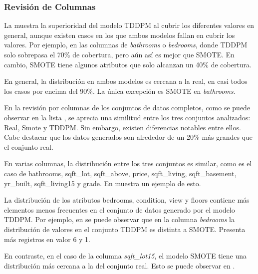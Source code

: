 \newpage
\subsubsection{Revisión de Columnas}
La  muestra la superioridad del modelo TDDPM al cubrir los diferentes valores en general, aunque existen casos en los que ambos modelos fallan en cubrir los valores. Por ejemplo, en las columnas de \emph{bathrooms} o \emph{bedrooms}, donde TDDPM solo sobrepasa el 70\% de cobertura, pero aún así es mejor que SMOTE. En cambio, SMOTE tiene algunos atributos que solo alcanzan un 40\% de cobertura.



\newpage
En general, la distribución en ambos modelos es cercana a la real, en casi todos los casos por encima del 90\%. La única excepción es SMOTE en \emph{bathrooms}.



\newpage

En la revisión por columnas de los conjuntos de datos completos, como se puede observar en la lista , se aprecia una similitud entre los tres conjuntos analizados: Real, Smote y TDDPM. Sin embargo, existen diferencias notables entre ellos. Cabe destacar que los datos generados son alrededor de un 20\% más grandes que el conjunto real.

En varias columnas, la distribución entre los tres conjuntos es similar, como es el caso de bathrooms, sqft\_lot, sqft\_above, price, sqft\_living, sqft\_basement, yr\_built, sqft\_living15 y grade. En  muestra un ejemplo de esto.




\newpage
La distribución de los atributos bedrooms, condition, view y floors contiene más elementos menos frecuentes en el conjunto de datos generado por el modelo TDDPM. Por ejemplo, en  se puede observar que en la columna \emph{bedrooms} la distribución de valores en el conjunto TDDPM es distinta a SMOTE. Presenta más registros en valor 6 y 1.




\newpage
En contraste, en el caso de la columna \emph{sqft\_lot15}, el modelo SMOTE tiene una distribución más cercana a la del conjunto real. Esto se puede observar en .

